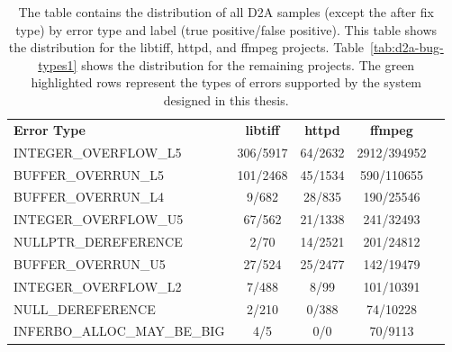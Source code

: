 \begin{table}
    \centering
    \caption{The table contains the distribution of all D2A samples (except the after fix type) by error type and label (true positive/false positive). This table shows the distribution for the libtiff, httpd, and ffmpeg projects. Table~\ref{tab:d2a-bug-types1} shows the distribution for the remaining projects. The green highlighted rows represent the types of errors supported by the system designed in this thesis.}
    \vskip6pt
    \begin{tabular}{!{\vrule width 1pt}l!{\vrule width 1pt}c|c|c!{\vrule width 1pt}c!{\vrule width 1pt}}
         {\footnotesize\textbf{Error Type}} & {\footnotesize\textbf{libtiff}} & {\footnotesize\textbf{httpd}} & {\footnotesize\textbf{ffmpeg}} \\
         {\scriptsize INTEGER\_OVERFLOW\_L5}&  {\footnotesize 306/5917}&  {\footnotesize 64/2632}&  {\footnotesize 2912/394952}\\ \hline
         {\scriptsize BUFFER\_OVERRUN\_L5}&  {\footnotesize 101/2468}&  {\footnotesize 45/1534}&  {\footnotesize 590/110655}\\ \hline
         {\scriptsize BUFFER\_OVERRUN\_L4}&  {\footnotesize 9/682}&  {\footnotesize 28/835}&  {\footnotesize 190/25546}\\ \hline
         {\scriptsize INTEGER\_OVERFLOW\_U5}&  {\footnotesize 67/562}&  {\footnotesize 21/1338}&  {\footnotesize 241/32493}\\ \hline
         {\scriptsize NULLPTR\_DEREFERENCE}&  {\footnotesize 2/70}&  {\footnotesize 14/2521}&  {\footnotesize 201/24812}\\ \hline
         {\scriptsize BUFFER\_OVERRUN\_U5}&  {\footnotesize 27/524}&  {\footnotesize 25/2477}&  {\footnotesize 142/19479}\\ \hline
         {\scriptsize INTEGER\_OVERFLOW\_L2}&  {\footnotesize 7/488}&  {\footnotesize 8/99}&  {\footnotesize 101/10391}\\ \hline
         {\scriptsize NULL\_DEREFERENCE}&  {\footnotesize 2/210}&  {\footnotesize 0/388}&  {\footnotesize 74/10228}\\ \hline
         {\scriptsize INFERBO\_ALLOC\_MAY\_BE\_BIG}&  {\footnotesize 4/5}&  {\footnotesize 0/0}&  {\footnotesize 70/9113}\\ \hline

\end{tabular}
\end{table}
